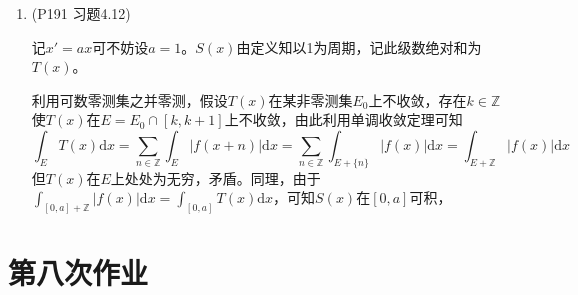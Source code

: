 \documentclass[a4paper,UTF8,fontset=windows]{ctexart}
\begin{document}
\begin{enumerate}
    \item (P191 习题4.12)
    
    记$x'=ax$可不妨设$a=1$。$S(x)$由定义知以1为周期，记此级数绝对和为$T(x)$。
    
    利用可数零测集之并零测，假设$T(x)$在某非零测集$E_0$上不收敛，存在$k\in\mathbb{Z}$使$T(x)$在$E=E_0\cap[k,k+1]$上不收敛，由此利用单调收敛定理可知
    \[\int_{E}T(x)\mathrm{d}x=\sum_{n\in\mathbb{Z}}\int_{E}|f(x+n)|\mathrm{d}x=\sum_{n\in\mathbb{Z}}\int_{E+\{n\}}|f(x)|\mathrm{d}x=\int_{E+\mathbb{Z}}|f(x)|\mathrm{d}x\]
    但$T(x)$在$E$上处处为无穷，矛盾。同理，由于$\int_{[0,a]+\mathbb{Z}}|f(x)|\mathrm{d}x=\int_{[0,a]}T(x)\mathrm{d}x$，可知$S(x)$在$[0,a]$可积，
\end{enumerate}

\section{第八次作业}
\end{document}
